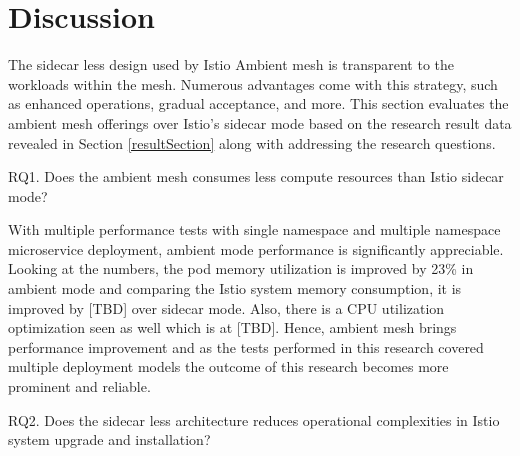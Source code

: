 \section{Discussion}
The sidecar less design used by Istio Ambient mesh is transparent to the workloads within the mesh. Numerous advantages come with this strategy, such as enhanced operations, gradual acceptance, and more. This section evaluates the ambient mesh offerings over Istio's sidecar mode based on the research result data revealed in Section \ref{resultSection} along with addressing the research questions.

RQ1. Does the ambient mesh consumes less compute resources than Istio sidecar mode?

With multiple performance tests with single namespace and multiple namespace microservice deployment, ambient mode performance is significantly appreciable. Looking at the numbers, the pod memory utilization is improved by 23\% in ambient mode and comparing the Istio system memory consumption, it is improved by [TBD] over sidecar mode. Also, there is a CPU utilization optimization seen as well which is at [TBD]. Hence, ambient mesh brings performance improvement and as the tests performed in this research covered multiple deployment models the outcome of this research becomes more prominent and reliable.

RQ2. Does the sidecar less architecture reduces operational complexities in Istio system upgrade and installation?

